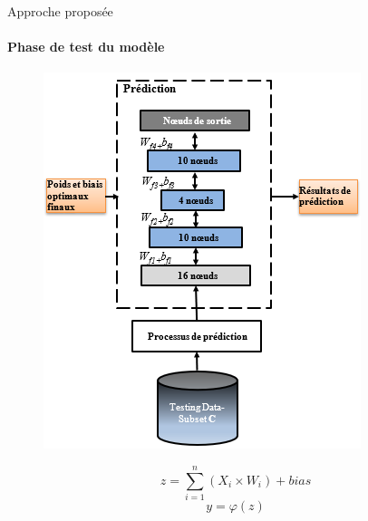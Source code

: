 \documentclass[aspectratio=169,professionalfonts, 12pt]{beamer}
\begin{document}
\begin{frame}{Approche proposée}
	\framesubtitle{Phase de test du modèle}
	\begin{minipage}{0.5\textwidth}
  	\begin{figure}[t]
	       \centering
 \includegraphics[height=0.7\textheight]{images/testing}
	    \end{figure}
\end{minipage}
	\begin{minipage}{0.3\textwidth}
  	\begin{block}{}
	 $$z = \sum_{i=1}^n (X_i \times W_i) + bias$$
	$$y = \varphi (z)$$
	\end{block}
\end{minipage}
\end{frame} 
\end{document}

